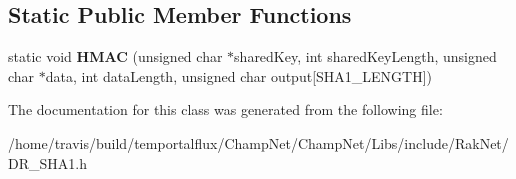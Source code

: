 \subsection*{Static Public Member Functions}
\begin{DoxyCompactItemize}
\item 
\hypertarget{class_c_s_h_a1_ac50dfcc11b0e2eeec2426658ac2ab65b}{static void {\bfseries H\-M\-A\-C} (unsigned char $\ast$shared\-Key, int shared\-Key\-Length, unsigned char $\ast$data, int data\-Length, unsigned char output\mbox{[}S\-H\-A1\-\_\-\-L\-E\-N\-G\-T\-H\mbox{]})}\label{class_c_s_h_a1_ac50dfcc11b0e2eeec2426658ac2ab65b}

\end{DoxyCompactItemize}


The documentation for this class was generated from the following file\-:\begin{DoxyCompactItemize}
\item 
/home/travis/build/temportalflux/\-Champ\-Net/\-Champ\-Net/\-Libs/include/\-Rak\-Net/D\-R\-\_\-\-S\-H\-A1.\-h\end{DoxyCompactItemize}

